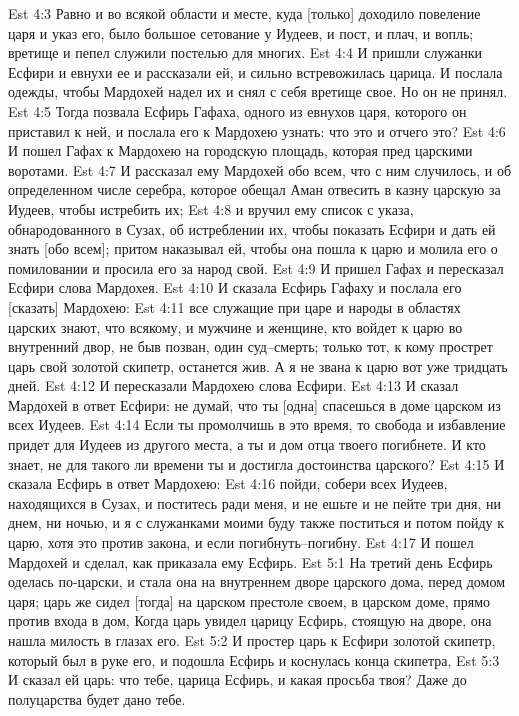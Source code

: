 Est 4:3  Равно и во всякой области и месте, куда [только] доходило повеление царя и указ его, было большое сетование у Иудеев, и пост, и плач, и вопль; вретище и пепел служили постелью для многих.
Est 4:4  И пришли служанки Есфири и евнухи ее и рассказали ей, и сильно встревожилась царица. И послала одежды, чтобы Мардохей надел их и снял с себя вретище свое. Но он не принял.
Est 4:5  Тогда позвала Есфирь Гафаха, одного из евнухов царя, которого он приставил к ней, и послала его к Мардохею узнать: что это и отчего это?
Est 4:6  И пошел Гафах к Мардохею на городскую площадь, которая пред царскими воротами.
Est 4:7  И рассказал ему Мардохей обо всем, что с ним случилось, и об определенном числе серебра, которое обещал Аман отвесить в казну царскую за Иудеев, чтобы истребить их;
Est 4:8  и вручил ему список с указа, обнародованного в Сузах, об истреблении их, чтобы показать Есфири и дать ей знать [обо всем]; притом наказывал ей, чтобы она пошла к царю и молила его о помиловании и просила его за народ свой.
Est 4:9  И пришел Гафах и пересказал Есфири слова Мардохея.
Est 4:10  И сказала Есфирь Гафаху и послала его [сказать] Мардохею:
Est 4:11  все служащие при царе и народы в областях царских знают, что всякому, и мужчине и женщине, кто войдет к царю во внутренний двор, не быв позван, один суд--смерть; только тот, к кому прострет царь свой золотой скипетр, останется жив. А я не звана к царю вот уже тридцать дней.
Est 4:12  И пересказали Мардохею слова Есфири.
Est 4:13  И сказал Мардохей в ответ Есфири: не думай, что ты [одна] спасешься в доме царском из всех Иудеев.
Est 4:14  Если ты промолчишь в это время, то свобода и избавление придет для Иудеев из другого места, а ты и дом отца твоего погибнете. И кто знает, не для такого ли времени ты и достигла достоинства царского?
Est 4:15  И сказала Есфирь в ответ Мардохею:
Est 4:16  пойди, собери всех Иудеев, находящихся в Сузах, и поститесь ради меня, и не ешьте и не пейте три дня, ни днем, ни ночью, и я с служанками моими буду также поститься и потом пойду к царю, хотя это против закона, и если погибнуть--погибну.
Est 4:17  И пошел Мардохей и сделал, как приказала ему Есфирь.
Est 5:1  На третий день Есфирь оделась по-царски, и стала она на внутреннем дворе царского дома, перед домом царя; царь же сидел [тогда] на царском престоле своем, в царском доме, прямо против входа в дом, Когда царь увидел царицу Есфирь, стоящую на дворе, она нашла милость в глазах его.
Est 5:2  И простер царь к Есфири золотой скипетр, который был в руке его, и подошла Есфирь и коснулась конца скипетра,
Est 5:3  И сказал ей царь: что тебе, царица Есфирь, и какая просьба твоя? Даже до полуцарства будет дано тебе.
